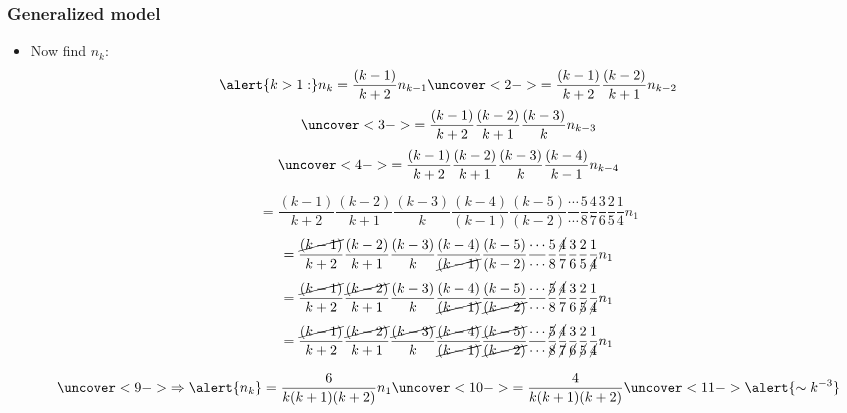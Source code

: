 \begin{frame}
  \frametitle{Generalized model}

  \begin{itemize}
  \item<1-> Now find $n_k$:
    $$
    \alert{k>1:}
    n_k
    =
    \frac{(k-1)}{k+2} n_{k-1} 
    \uncover<2->{
      =
      \frac{(k-1)}{k+2}
      \frac{(k-2)}{k+1} n_{k-2} 
    }
    $$
    $$
    \uncover<3->{
      =
      \frac{(k-1)}{k+2} 
    \frac{(k-2)}{k+1} 
    \frac{(k-3)}{k} n_{k-3} 
    }
    $$
    $$
    \uncover<4->{
      =
      \frac{(k-1)}{k+2} 
      \frac{(k-2)}{k+1} 
      \frac{(k-3)}{k} 
      \frac{(k-4)}{k-1} n_{k-4} 
    }
    $$%
    \begin{overprint}%
      $$
      =
      \frac{(k-1)}{k+2} 
      \frac{(k-2)}{k+1} 
      \frac{(k-3)}{k} 
      \frac{(k-4)}{(k-1)} 
      \frac{(k-5)}{(k-2)} 
      \frac{\cdots}{\cdots}
      \frac{5}{8}
      \frac{4}{7}
      \frac{3}{6}
      \frac{2}{5}
      \frac{1}{4}
      n_1
      $$
      $$
      =
      \frac{\cancel{(k-1)}}{k+2} 
      \frac{(k-2)}{k+1} 
      \frac{(k-3)}{k} 
      \frac{(k-4)}{\cancel{(k-1)}}
      \frac{(k-5)}{(k-2)} 
      \frac{\cdots}{\cdots}
      \frac{5}{8}
      \frac{\cancel{4}}{7}
      \frac{3}{6}
      \frac{2}{5}
      \frac{1}{\cancel{4}}
      n_1
      $$
      $$
      =
      \frac{\cancel{(k-1)}}{k+2} 
      \frac{\cancel{(k-2)}}{k+1} 
      \frac{{(k-3)}}{k} 
      \frac{{(k-4)}}{\cancel{(k-1)}}
      \frac{{(k-5)}}{\cancel{(k-2)}}
      \frac{\cdots}{\cdots}
      \frac{\cancel{5}}{{8}}
      \frac{\cancel{4}}{{7}}
      \frac{3}{{6}}
      \frac{2}{\cancel{5}}
      \frac{1}{\cancel{4}}
      n_1
      $$
      $$
      =
      \frac{\cancel{(k-1)}}{k+2} 
      \frac{\cancel{(k-2)}}{k+1} 
      \frac{\cancel{(k-3)}}{k} 
      \frac{\cancel{(k-4)}}{\cancel{(k-1)}}
      \frac{\cancel{(k-5)}}{\cancel{(k-2)}}
      \frac{\cdots}{\cdots}
      \frac{\cancel{5}}{\cancel{8}}
      \frac{\cancel{4}}{\cancel{7}}
      \frac{3}{\cancel{6}}
      \frac{2}{\cancel{5}}
      \frac{1}{\cancel{4}}
      n_1
      $$
    \end{overprint}
    $$
    \uncover<9->{
      \Rightarrow \alert{n_k} = 
      \frac{6}{k(k+1)(k+2)} n_1
    }
    \uncover<10->{
      =
      \frac{4}{k(k+1)(k+2)}
    }
    \uncover<11->{
      \alert{\sim k^{-3}}
    }
    $$
    
  \end{itemize}
\end{frame}


